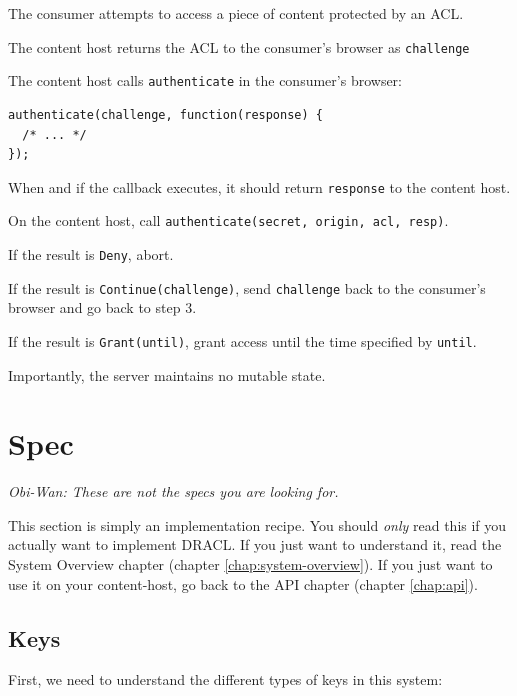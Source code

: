 \documentclass[pdftex,12pt,a4papaer,twoside,notitlepage]{report}
\begin{document}
\begin{compactenum}
\item The consumer attempts to access a piece of content protected by an ACL.
\item \server{} The content host returns the ACL to the consumer's browser as
  \texttt{challenge}
\item \client{} The content host calls \texttt{authenticate} in the
  consumer's browser:
  \begin{verbatim}
authenticate(challenge, function(response) {
  /* ... */
});
\end{verbatim}
\item \client{} When and if the callback executes, it should return
  \texttt{response} to the content host.
\item \server{} On the content host, call \verb=authenticate(secret, origin, acl, resp)=.
\item \server{} If the result is \texttt{Deny}, abort.
\item \server{} If the result is \texttt{Continue(challenge)}, send \texttt{challenge}
  back to the consumer's browser and go back to step 3.
\item \server{} If the result is \texttt{Grant(until)}, grant access until the
  time specified by \texttt{until}.
\end{compactenum}

Importantly, the server maintains no mutable state.

\chapter{Spec}

\emph{Obi-Wan: These are not the specs you are looking for.}

This section is simply an implementation recipe. You should \emph{only} read
this if you actually want to implement DRACL. If you just want to understand it,
read the System Overview chapter (chapter \ref{chap:system-overview}). If you
just want to use it on your content-host, go back to the API chapter (chapter
\ref{chap:api}).

\section{Keys}

First, we need to understand the different types of keys in this system:
\end{document}

